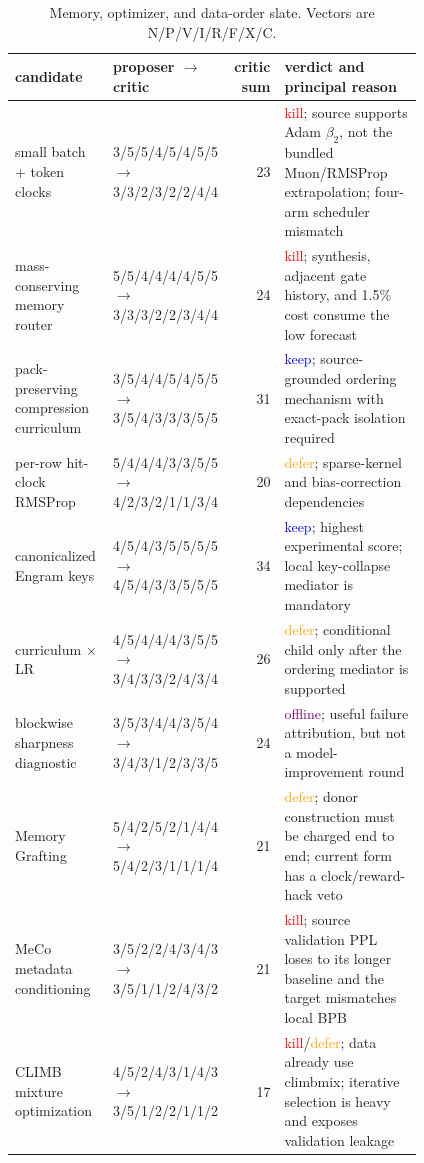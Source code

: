 \documentclass{article}
\newcommand{\keepx}{\textcolor{blue}{keep}}
\newcommand{\killx}{\textcolor{red}{kill}}
\newcommand{\deferx}{\textcolor{orange}{defer}}
\newcommand{\offline}{\textcolor{purple}{offline}}
\begin{document}
\begin{table}[t]
\caption{Memory, optimizer, and data-order slate.  Vectors are
N/P/V/I/R/F/X/C.}
\label{tab:memory}
\centering\tiny
\setlength{\tabcolsep}{2.7pt}
\begin{tabular}{p{0.245\linewidth}p{0.22\linewidth}r p{0.345\linewidth}}
\toprule
candidate & proposer $\rightarrow$ critic & critic sum & verdict and principal reason\\
\midrule
small batch + token clocks &
3/5/5/4/5/4/5/5 $\rightarrow$ 3/3/2/3/2/2/4/4 & 23 &
\killx; source supports Adam $\beta_2$, not the bundled Muon/RMSProp extrapolation; four-arm scheduler mismatch\\
mass-conserving memory router &
5/5/4/4/4/4/5/5 $\rightarrow$ 3/3/3/2/2/3/4/4 & 24 &
\killx; synthesis, adjacent gate history, and 1.5\% cost consume the low forecast\\
pack-preserving compression curriculum &
3/5/4/4/5/4/5/5 $\rightarrow$ 3/5/4/3/3/3/5/5 & 31 &
\keepx; source-grounded ordering mechanism with exact-pack isolation required\\
per-row hit-clock RMSProp &
5/4/4/4/3/3/5/5 $\rightarrow$ 4/2/3/2/1/1/3/4 & 20 &
\deferx; sparse-kernel and bias-correction dependencies\\
canonicalized Engram keys &
4/5/4/3/5/5/5/5 $\rightarrow$ 4/5/4/3/3/5/5/5 & 34 &
\keepx; highest experimental score; local key-collapse mediator is mandatory\\
curriculum $\times$ LR &
4/5/4/4/4/3/5/5 $\rightarrow$ 3/4/3/3/2/4/3/4 & 26 &
\deferx; conditional child only after the ordering mediator is supported\\
blockwise sharpness diagnostic &
3/5/3/4/4/3/5/4 $\rightarrow$ 3/4/3/1/2/3/3/5 & 24 &
\offline; useful failure attribution, but not a model-improvement round\\
Memory Grafting &
5/4/2/5/2/1/4/4 $\rightarrow$ 5/4/2/3/1/1/1/4 & 21 &
\deferx; donor construction must be charged end to end; current form has a clock/reward-hack veto\\
MeCo metadata conditioning &
3/5/2/2/4/3/4/3 $\rightarrow$ 3/5/1/1/2/4/3/2 & 21 &
\killx; source validation PPL loses to its longer baseline and the target mismatches local BPB\\
CLIMB mixture optimization &
4/5/2/4/3/1/4/3 $\rightarrow$ 3/5/1/2/2/1/1/2 & 17 &
\killx/\deferx; data already use climbmix; iterative selection is heavy and exposes validation leakage\\
\bottomrule
\end{tabular}
\end{table}
\end{document}
